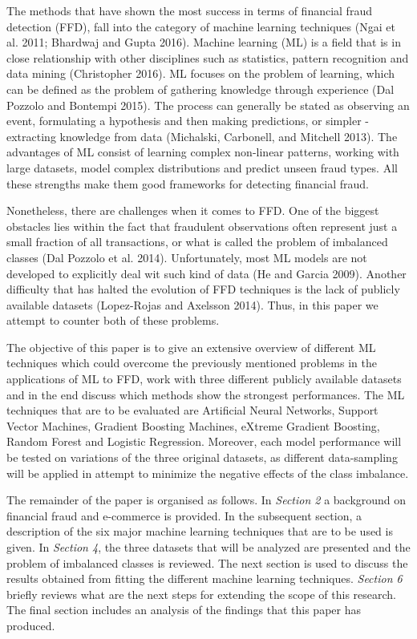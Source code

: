 \documentclass[12pt,]{article}
\begin{document}
The methods that have shown the most success in terms of financial fraud
detection (FFD), fall into the category of machine learning techniques
(Ngai et al. 2011; Bhardwaj and Gupta 2016). Machine learning (ML) is a
field that is in close relationship with other disciplines such as
statistics, pattern recognition and data mining (Christopher 2016). ML
focuses on the problem of learning, which can be defined as the problem
of gathering knowledge through experience (Dal Pozzolo and Bontempi
2015). The process can generally be stated as observing an event,
formulating a hypothesis and then making predictions, or simpler -
extracting knowledge from data (Michalski, Carbonell, and Mitchell
2013). The advantages of ML consist of learning complex non-linear
patterns, working with large datasets, model complex distributions and
predict unseen fraud types. All these strengths make them good
frameworks for detecting financial fraud.

Nonetheless, there are challenges when it comes to FFD. One of the
biggest obstacles lies within the fact that fraudulent observations
often represent just a small fraction of all transactions, or what is
called the problem of imbalanced classes (Dal Pozzolo et al. 2014).
Unfortunately, most ML models are not developed to explicitly deal wit
such kind of data (He and Garcia 2009). Another difficulty that has
halted the evolution of FFD techniques is the lack of publicly available
datasets (Lopez-Rojas and Axelsson 2014). Thus, in this paper we attempt
to counter both of these problems.

The objective of this paper is to give an extensive overview of
different ML techniques which could overcome the previously mentioned
problems in the applications of ML to FFD, work with three different
publicly available datasets and in the end discuss which methods show
the strongest performances. The ML techniques that are to be evaluated
are Artificial Neural Networks, Support Vector Machines, Gradient
Boosting Machines, eXtreme Gradient Boosting, Random Forest and Logistic
Regression. Moreover, each model performance will be tested on
variations of the three original datasets, as different data-sampling
will be applied in attempt to minimize the negative effects of the class
imbalance.

The remainder of the paper is organised as follows. In \emph{Section 2}
a background on financial fraud and e-commerce is provided. In the
subsequent section, a description of the six major machine learning
techniques that are to be used is given. In \emph{Section 4}, the three
datasets that will be analyzed are presented and the problem of
imbalanced classes is reviewed. The next section is used to discuss the
results obtained from fitting the different machine learning techniques.
\emph{Section 6} briefly reviews what are the next steps for extending
the scope of this research. The final section includes an analysis of
the findings that this paper has produced.
\end{document}
